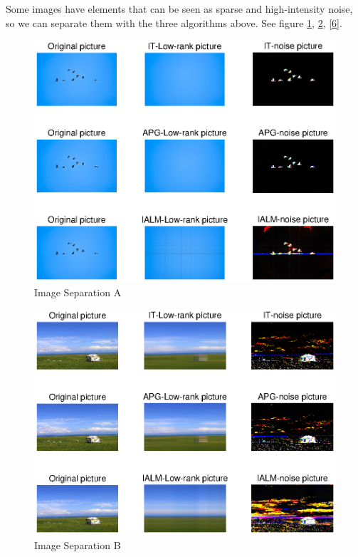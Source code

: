 \documentclass[UTF8]{report}
\begin{document}
Some images have elements that can be seen as sparse and high-intensity noise, so we can separate them with the three algorithms above. See figure \ref{4}, \ref{5}, \ref{6}.
\begin{figure}
\centering
\includegraphics{Image Separation A.eps}
\caption{Image Separation A}
\label{4}
\end{figure}
\begin{figure}
\centering
\includegraphics{Image Separation B.eps}
\caption{Image Separation B}
\label{5}
\end{figure}
\end{document}
